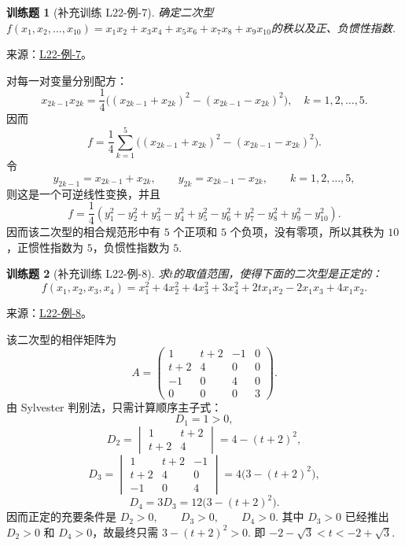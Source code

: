 \documentclass[12pt,fontset=fandol]{ctexart}
\newtheorem{exercise}{训练题}[section]
\begin{document}
\begin{exercise}[补充训练 L22-例-7]\label{prob:L22-例-7}
确定二次型$f(x_1,x_2,\ldots,x_{10})=x_1x_2+x_3x_4+x_5x_6+x_7x_8+x_9x_{10}$的秩以及正、负惯性指数.
\end{exercise}
\noindent 来源：\href{https://github.com/yhwu-is/Linear-Algebra-Left-Undone/blob/new/%E8%AE%B2%E4%B9%89/%E4%B8%93%E9%A2%98/22%20%E4%BA%8C%E6%AC%A1%E5%9E%8B.tex}{L22-例-7}。
\begin{solve}
对每一对变量分别配方：
    \[
        x_{2k-1}x_{2k}=\frac{1}{4}\bigl((x_{2k-1}+x_{2k})^2-(x_{2k-1}-x_{2k})^2\bigr), \quad k=1,2,\ldots,5.
    \]
    因而
    \[
        f=\frac{1}{4}\sum_{k=1}^5\bigl((x_{2k-1}+x_{2k})^2-(x_{2k-1}-x_{2k})^2\bigr).
    \]
    令
    \[
        y_{2k-1}=x_{2k-1}+x_{2k}, \qquad y_{2k}=x_{2k-1}-x_{2k}, \qquad k=1,2,\ldots,5,
    \]
    则这是一个可逆线性变换，并且
    \[
        f=\frac{1}{4}(y_1^2-y_2^2+y_3^2-y_4^2+y_5^2-y_6^2+y_7^2-y_8^2+y_9^2-y_{10}^2).
    \]
    因而该二次型的相合规范形中有 $5$ 个正项和 $5$ 个负项，没有零项，所以其秩为 $10$，正惯性指数为 $5$，负惯性指数为 $5$.
\end{solve}

\begin{exercise}[补充训练 L22-例-8]\label{prob:L22-例-8}
求$t$的取值范围，使得下面的二次型是正定的：
    \[f(x_1,x_2,x_3,x_4) = x_1^2+4x_2^2+4x_3^2+3x_4^2+2tx_1x_2-2x_1x_3+4x_1x_2.\]
\end{exercise}
\noindent 来源：\href{https://github.com/yhwu-is/Linear-Algebra-Left-Undone/blob/new/%E8%AE%B2%E4%B9%89/%E4%B8%93%E9%A2%98/22%20%E4%BA%8C%E6%AC%A1%E5%9E%8B.tex}{L22-例-8}。
\begin{solve}
该二次型的相伴矩阵为
    \[
        A=\begin{pmatrix}
            1 & t+2 & -1 & 0 \\
            t+2 & 4 & 0 & 0 \\
            -1 & 0 & 4 & 0 \\
            0 & 0 & 0 & 3
        \end{pmatrix}.
    \]
    由 Sylvester 判别法，只需计算顺序主子式：
    \[
        D_1=1>0,
    \]
    \[
        D_2=\begin{vmatrix}
            1 & t+2 \\
            t+2 & 4
        \end{vmatrix}
        =4-(t+2)^2,
    \]
    \[
        D_3 = \begin{vmatrix}
                 1 & t+2 & -1 \\
                 t+2 & 4 & 0 \\
                 -1 & 0 & 4
             \end{vmatrix} = 4\bigl(3-(t+2)^2\bigr),
    \]
    \[
        D_4=3D_3=12\bigl(3-(t+2)^2\bigr).
    \]
    因而正定的充要条件是 $D_2>0,\qquad D_3>0,\qquad D_4>0$. 其中 $D_3>0$ 已经推出 $D_2>0$ 和 $D_4>0$，故最终只需 $3-(t+2)^2>0$. 即 $-2-\sqrt{3}<t<-2+\sqrt{3}$.
\end{solve}
\end{document}
